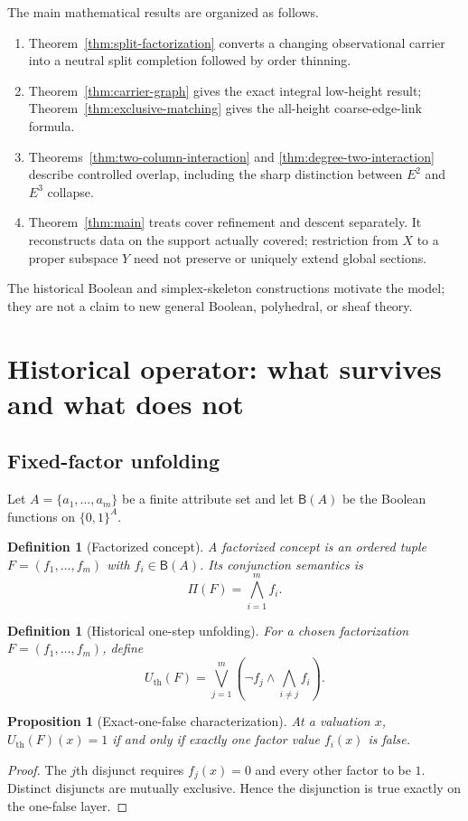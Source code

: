 \documentclass[11pt]{article}
\newtheorem{proposition}[theorem]{Proposition}
\newtheorem{definition}[theorem]{Definition}
\begin{document}
The main mathematical results are organized as follows.
\begin{enumerate}[label=(\arabic*)]
\item Theorem~\ref{thm:split-factorization} converts a changing observational
carrier into a neutral split completion followed by order thinning.
\item Theorem~\ref{thm:carrier-graph} gives the exact integral low-height result;
Theorem~\ref{thm:exclusive-matching} gives the all-height coarse-edge-link formula.
\item Theorems~\ref{thm:two-column-interaction} and
\ref{thm:degree-two-interaction} describe controlled overlap, including the
sharp distinction between $E^2$ and $E^3$ collapse.
\item Theorem~\ref{thm:main} treats cover refinement and descent separately.
It reconstructs data on the support actually covered; restriction from $X$ to
a proper subspace $Y$ need not preserve or uniquely extend global sections.
\end{enumerate}
The historical Boolean and simplex-skeleton constructions motivate the model;
they are not a claim to new general Boolean, polyhedral, or sheaf theory.

\section{Historical operator: what survives and what does not}

\subsection{Fixed-factor unfolding}

Let $A=\{a_1,\dots,a_m\}$ be a finite attribute set and let $\mathsf B(A)$ be the Boolean functions on $\{0,1\}^A$.

\begin{definition}[Factorized concept]
A factorized concept is an ordered tuple $F=(f_1,\dots,f_m)$ with $f_i\in\mathsf B(A)$.  Its conjunction semantics is
\[
\Pi(F)=\bigwedge_{i=1}^m f_i.
\]
\end{definition}

\begin{definition}[Historical one-step unfolding]
For a chosen factorization $F=(f_1,\dots,f_m)$, define
\[
U_{\mathrm{th}}(F)
=\bigvee_{j=1}^m\left(\neg f_j\wedge\bigwedge_{i\neq j}f_i\right).
\]
\end{definition}

\begin{proposition}[Exact-one-false characterization]
At a valuation $x$, $U_{\mathrm{th}}(F)(x)=1$ if and only if exactly one factor value $f_i(x)$ is false.
\end{proposition}
\begin{proof}
The $j$th disjunct requires $f_j(x)=0$ and every other factor to be $1$.  Distinct disjuncts are mutually exclusive.  Hence the disjunction is true exactly on the one-false layer.
\end{proof}
\end{document}
